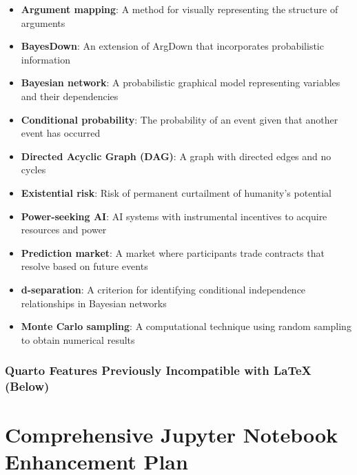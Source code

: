 \documentclass[
  11pt,
  letterpaper,
]{book}
\providecommand{\tightlist}{%
  \setlength{\itemsep}{0pt}\setlength{\parskip}{0pt}}
\begin{document}
\begin{itemize}
\tightlist
\item
  \textbf{Argument mapping}: A method for visually representing the
  structure of arguments\\
\item
  \textbf{BayesDown}: An extension of ArgDown that incorporates
  probabilistic information\\
\item
  \textbf{Bayesian network}: A probabilistic graphical model
  representing variables and their dependencies\\
\item
  \textbf{Conditional probability}: The probability of an event given
  that another event has occurred\\
\item
  \textbf{Directed Acyclic Graph (DAG)}: A graph with directed edges and
  no cycles\\
\item
  \textbf{Existential risk}: Risk of permanent curtailment of humanity's
  potential\\
\item
  \textbf{Power-seeking AI}: AI systems with instrumental incentives to
  acquire resources and power\\
\item
  \textbf{Prediction market}: A market where participants trade
  contracts that resolve based on future events\\
\item
  \textbf{d-separation}: A criterion for identifying conditional
  independence relationships in Bayesian networks\\
\item
  \textbf{Monte Carlo sampling}: A computational technique using random
  sampling to obtain numerical results
\end{itemize}

\subsection*{Quarto Features Previously Incompatible with LaTeX
(Below)}\label{quarto-features-previously-incompatible-with-latex-below}


\chapter{Comprehensive Jupyter Notebook Enhancement
Plan}\label{comprehensive-jupyter-notebook-enhancement-plan}
\end{document}
